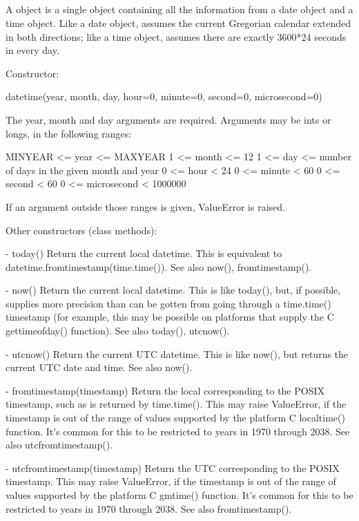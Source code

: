 {\subsection{ \label{datetime-datetime}}

A  object is a single object containing all the information from
a date object and a time object.  Like a date object,  assumes
the current Gregorian calendar extended in both directions; like a time
object,  assumes there are exactly 3600*24 seconds in every day.

Constructor:

    datetime(year, month, day,
             hour=0, minute=0, second=0, microsecond=0)

    The year, month and day arguments are required.  Arguments may be ints
    or longs, in the following ranges:

        MINYEAR <= year <= MAXYEAR
        1 <= month <= 12
        1 <= day <= number of days in the given month and year
        0 <= hour < 24
        0 <= minute < 60
        0 <= second < 60
        0 <= microsecond < 1000000

    If an argument outside those ranges is given, ValueError is raised.

Other constructors (class methods):

  - today()
    Return the current local datetime.  This is equivalent to
    datetime.fromtimestamp(time.time()).
    See also now(), fromtimestamp().

  - now()
    Return the current local datetime.  This is like today(), but, if
    possible, supplies more precision than can be gotten from going
    through a time.time() timestamp (for example, this may be possible
    on platforms that supply the C gettimeofday() function).
    See also today(), utcnow().

  - utcnow()
    Return the current UTC datetime.  This is like now(), but returns
    the current UTC date and time.
    See also now().

  - fromtimestamp(timestamp)
    Return the local  corresponding to the POSIX timestamp, such
    as is returned by time.time().  This may raise ValueError, if the
    timestamp is out of the range of values supported by the platform C
    localtime() function.  It's common for this to be restricted to
    years in 1970 through 2038.
    See also utcfromtimestamp().

  - utcfromtimestamp(timestamp)
    Return the UTC  corresponding to the POSIX timestamp.
    This may raise ValueError, if the timestamp is out of the range of
    values supported by the platform C gmtime() function.  It's common
    for this to be restricted to years in 1970 through 2038.
    See also fromtimestamp().

}
